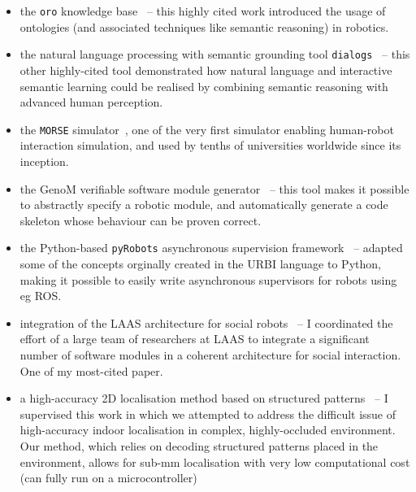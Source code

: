 \begin{itemize}
    \item the \texttt{oro} knowledge base~\autocite{lemaignan2010oro} --
        this highly cited work introduced the usage of ontologies (and
        associated techniques like semantic reasoning) in robotics.

    \item the natural language processing with semantic grounding tool
        \texttt{dialogs}~\autocite{lemaignan2011grounding} -- this other
        highly-cited tool demonstrated how natural language and interactive
        semantic learning could be realised by combining semantic reasoning with
        advanced human perception.

    \item the \texttt{MORSE} simulator~\autocite{echeverria2011morse,
        lemaignan2012morse}, one of the very first simulator enabling
        human-robot interaction simulation, and used by tenths of universities
        worldwide since its inception.

    \item the GenoM verifiable software module
        generator~\autocite{mallet2010genom3} -- this tool makes it possible to
        abstractly specify a robotic module, and automatically generate a code
        skeleton whose behaviour can be proven correct.

    \item the Python-based \texttt{pyRobots} asynchronous supervision
        framework~\autocite{lemaignan2015pyrobots} -- adapted some of the concepts
        orginally created in the URBI language to Python, making it possible to
        easily write asynchronous supervisors for robots using eg ROS.

    \item integration of the LAAS architecture for social
        robots~\autocite{lemaignan2017artificial} -- I coordinated the effort of
        a large team of researchers at LAAS to integrate a significant number of
        software modules in a coherent architecture for social interaction. One
        of my most-cited paper.

    \item a high-accuracy 2D localisation method based on structured
        patterns~\autocite{hostettler2016realtime} -- I supervised this work
        in which we attempted to address the difficult issue of high-accuracy
        indoor localisation in complex, highly-occluded environment. Our method,
        which relies on decoding structured patterns placed in the environment,
        allows for sub-mm localisation with very low computational cost (can
        fully run on a microcontroller)


\end{itemize}
